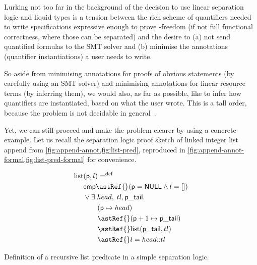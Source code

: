 Lurking not too far in the background of the decision to use linear separation
logic and liquid types is a tension between the rich scheme of quantifiers
needed to write specifications expressive enough to prove -freedom (if
not full functional correctness, where those can be separated) and the desire
to (a) not send quantified formulas to the SMT solver and (b) minimise the
annotations (quantifier instantiations) a user needs to write.

So aside from minimising annotations for proofs of obvious statements (by
carefully using an SMT solver) and minimising annotations for linear resource
terms (by inferring them), we would also, as far as possible, like to
infer how quantifiers are instantiated, based on what the user wrote. This is a tall order,
because the problem is not decidable in
general~.

Yet, we can still proceed and make the problem clearer by using a concrete
example. Let us recall the separation logic proof sketch of linked integer list
append from \cref{fig:append-annot,fig:list-pred}, reproduced in
\cref{fig:append-annot-formal,fig:list-pred-formal} for convenience.

\begin{marginfigure}
    \centering
    \begin{align*}
        \mathrm{list} &(\mathsf{p}, l) \mathrel{{=}^\mathrm{def}} \\
                      &\mathsf{emp} \astRef{} (\mathsf{p} = \mathsf{NULL} \wedge{} l = []) \\
                      &\vee{} \exists{} \; {head}, \; {tl}, \mathsf{p\_tail}.\\
                      &\qquad (\mathsf{p} \mapsto{} {head}) \\
                      &\qquad \astRef{} (\mathsf{p} + 1 \mapsto{} \mathsf{p\_tail}) \\
                      &\qquad \astRef{} \mathrm{list} (\mathsf{p\_tail}, {tl}) \\
                      &\qquad \astRef{} l = {head} {:}{:} {tl} \\
    \end{align*}
    \caption{Definition of a recursive list predicate in a simple separation
        logic.}\label{fig:list-pred-formal}
\end{marginfigure}

